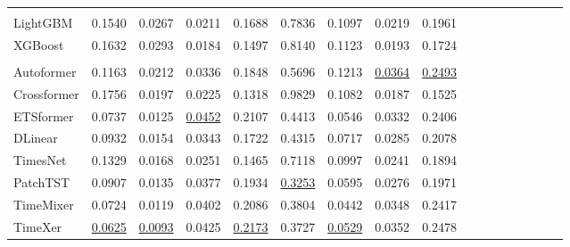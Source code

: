 \begin{table}[htbp]
{\begin{tabular}{lcccccccccccccccc}
  \rowcolor{gray!15}
  \multicolumn{9}{c}{\textit{\textbf{ML-based}}} \\
  LightGBM  & 0.1540 & 0.0267 & 0.0211 & 0.1688 & 0.7836 & 0.1097 & 0.0219 & 0.1961 \\
  XGBoost   & 0.1632 & 0.0293 & 0.0184 & 0.1497 & 0.8140 & 0.1123 & 0.0193 & 0.1724 \\
  \rowcolor{gray!15}
  \multicolumn{9}{c}{\textit{\textbf{DL-based}}} \\
  Autoformer   & 0.1163 & 0.0212 & 0.0336 & 0.1848 & 0.5696 & 0.1213 & \underline{0.0364} & \underline{0.2493} \\
  Crossformer  & 0.1756 & 0.0197 & 0.0225 & 0.1318 & 0.9829 & 0.1082 & 0.0187 & 0.1525 \\
  ETSformer    & 0.0737 & 0.0125 & \underline{0.0452} & 0.2107 & 0.4413 & 0.0546 & 0.0332 & 0.2406 \\
  DLinear      & 0.0932 & 0.0154 & 0.0343 & 0.1722 & 0.4315 & 0.0717 & 0.0285 & 0.2078 \\
  TimesNet     & 0.1329 & 0.0168 & 0.0251 & 0.1465 & 0.7118 & 0.0997 & 0.0241 & 0.1894 \\
  PatchTST     & 0.0907 & 0.0135 & 0.0377 & 0.1934 & \underline{0.3253} & 0.0595 & 0.0276 & 0.1971 \\
  TimeMixer    & 0.0724 & 0.0119 & 0.0402 & 0.2086 & 0.3804 & 0.0442 & 0.0348 & 0.2417 \\
  TimeXer      & \underline{0.0625} & \underline{0.0093} & 0.0425 & \underline{0.2173} & 0.3727 & \underline{0.0529} & 0.0352 & 0.2478 \\
  
  
  \bottomrule
  \end{tabular}
  }
  \end{table}